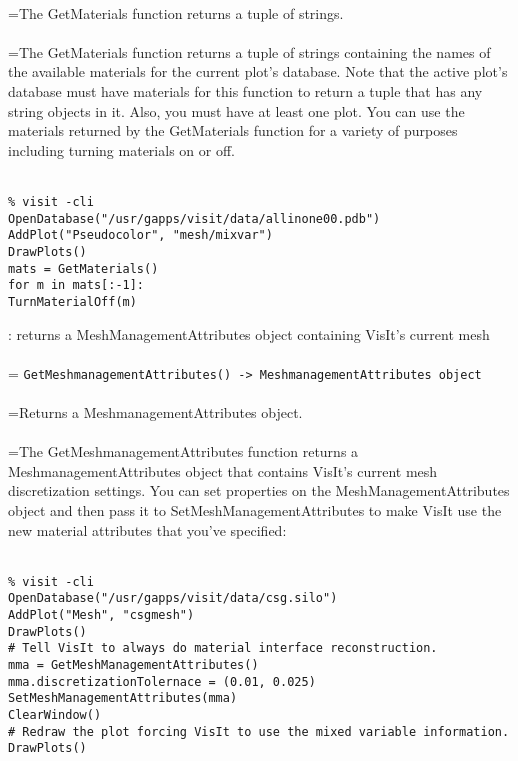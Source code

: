 \documentclass[10pt,a4paper]{report}
\begin{document}
 \\ 
\hangindent=\parindent The GetMaterials function returns a tuple of strings. \\[-3mm] 

 \\ 
\hangindent=\parindent The GetMaterials function returns a tuple of strings containing the names of the available materials for the current plot's database. Note that the active plot's database must have materials for this function to return a tuple that has any string objects in it. Also, you must have at least one plot. You can use the materials returned by the GetMaterials function for a variety of purposes including turning materials on or off. \\[-3mm] 

\\[-6mm]
\begin{verbatim}% visit -cli
OpenDatabase("/usr/gapps/visit/data/allinone00.pdb")
AddPlot("Pseudocolor", "mesh/mixvar")
DrawPlots()
mats = GetMaterials()
for m in mats[:-1]:
TurnMaterialOff(m)
\end{verbatim}
\newpage


{}
: returns a MeshManagementAttributes object containing VisIt's current mesh\\[-3mm]

 \\ 
\hangindent=\parindent 
\verb!GetMeshmanagementAttributes() -> MeshmanagementAttributes object!\\ [-3mm]

 \\ 
\hangindent=\parindent Returns a MeshmanagementAttributes object. \\[-3mm] 

 \\ 
\hangindent=\parindent The GetMeshmanagementAttributes function returns a MeshmanagementAttributes object that contains VisIt's current mesh discretization settings. You can set properties on the MeshManagementAttributes object and then pass it to SetMeshManagementAttributes to make VisIt use the new material attributes that you've specified: \\[-3mm] 

\\[-6mm]
\begin{verbatim}% visit -cli
OpenDatabase("/usr/gapps/visit/data/csg.silo")
AddPlot("Mesh", "csgmesh")
DrawPlots()
# Tell VisIt to always do material interface reconstruction.
mma = GetMeshManagementAttributes()
mma.discretizationTolernace = (0.01, 0.025)
SetMeshManagementAttributes(mma)
ClearWindow()
# Redraw the plot forcing VisIt to use the mixed variable information.
DrawPlots()
\end{verbatim}
\newpage
\end{document}
